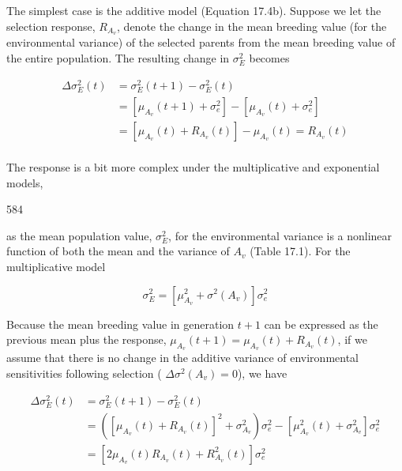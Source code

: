 \documentclass{article}
\begin{document}
The simplest case is the additive model (Equation 17.4b). Suppose we let the selection response,  $ R_{A_v} $, denote the change in the mean breeding value (for the environmental variance) of the selected parents from the mean breeding value of the entire population. The resulting change in  $ \sigma_E^2 $ becomes

\begin{equation}
\begin{aligned}\Delta\sigma_{E}^{2}(t)&=\sigma_{E}^{2}(t+1)-\sigma_{E}^{2}(t)\\&=\left[\mu_{A_{v}}(t+1)+\sigma_{e}^{2}\right]-\left[\mu_{A_{v}}(t)+\sigma_{e}^{2}\right]\\&=\left[\mu_{A_{v}}(t)+R_{A_{v}}(t)\right]-\mu_{A_{v}}(t)=R_{A_{v}}(t)\\ \end{aligned}
\tag{17.6a}
\label{eq:17_6a}
\end{equation}

The response is a bit more complex under the multiplicative and exponential models,

584

as the mean population value,  $ \sigma_{E}^{2} $, for the environmental variance is a nonlinear function of both the mean and the variance of  $ A_{v} $ (Table 17.1). For the multiplicative model

\begin{equation}
\sigma_{E}^{2}=\left[\mu_{A_{v}}^{2}+\sigma^{2}(A_{v})\right]\sigma_{e}^{2}
\end{equation}

Because the mean breeding value in generation  $ t+1 $ can be expressed as the previous mean plus the response,  $ \mu_{A_v}(t+1) = \mu_{A_v}(t) + R_{A_v}(t) $, if we assume that there is no change in the additive variance of environmental sensitivities following selection ( $ \Delta\sigma^2(A_v) = 0 $), we have

\begin{equation}
\begin{aligned}\Delta\sigma_{E}^{2}(t)&=\sigma_{E}^{2}(t+1)-\sigma_{E}^{2}(t)\\&=\left(\left[\mu_{A_{v}}(t)+R_{A_{v}}(t)\right]^{2}+\sigma_{A_{v}}^{2}\right)\sigma_{e}^{2}-\left[\mu_{A_{v}}^{2}(t)+\sigma_{A_{v}}^{2}\right]\sigma_{e}^{2}\\&=\left[2\mu_{A_{v}}(t)R_{A_{v}}(t)+R_{A_{v}}^{2}(t)\right]\sigma_{e}^{2}\\ \end{aligned}
\tag{17.6b}
\label{eq:17_6b}
\end{equation}
\end{document}
